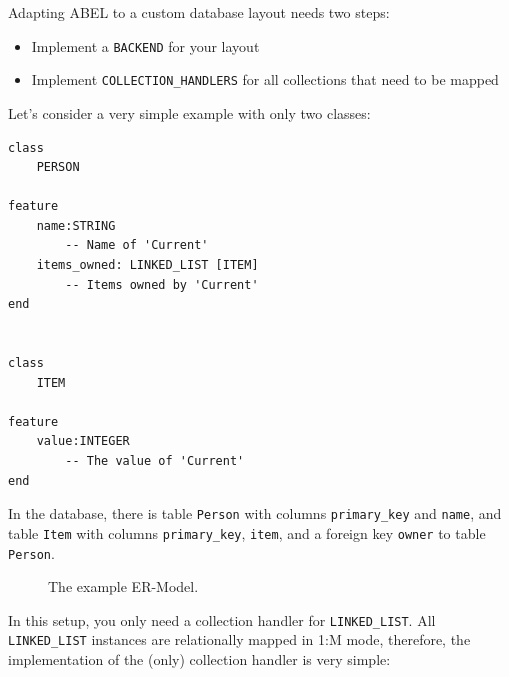 \documentclass[a4paper,12pt]{report}
\begin{document}
Adapting ABEL to a custom database layout needs two steps:
 \begin{itemize}
  \item Implement a \lstinline!BACKEND! for your layout
  \item Implement \lstinline!COLLECTION_HANDLERS! for all collections that need to be mapped
 \end{itemize}

Let's consider a very simple example with only two classes:

\begin{lstlisting}[language=OOSC2Eiffel, captionpos=b, caption={Example classes}, label={lst:example_application}]
class
	PERSON

feature
	name:STRING
		-- Name of 'Current'
	items_owned: LINKED_LIST [ITEM]
		-- Items owned by 'Current'
end


class 
	ITEM

feature
	value:INTEGER
		-- The value of 'Current'
end
\end{lstlisting}

In the database, there is table \lstinline!Person! with columns \lstinline!primary_key! and \lstinline!name!, 
and table \lstinline!Item! with columns \lstinline!primary_key!, \lstinline!item!, and a foreign key \lstinline!owner! to table \lstinline!Person!.


\begin{figure} [h!]
\centering
{}
\caption{The example ER-Model.}
\label{fig:er_model_example}
\end{figure}

In this setup, you only need a collection handler for \lstinline!LINKED_LIST!.
All \lstinline!LINKED_LIST! instances are relationally mapped in 1:M mode, therefore, the implementation of the (only) collection handler is very simple:
\end{document}
